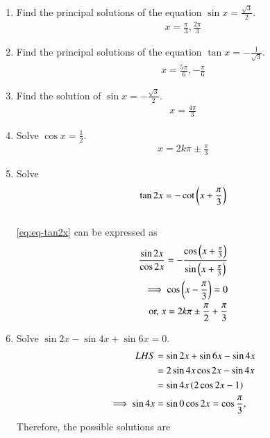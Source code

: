 \begin{enumerate}[label=\thesubsection.\arabic*,ref=\thesubsection.\theenumi]
\item Find the principal solutions of the equation $\sin x = \frac{\sqrt 3}{2}$.
%
	\\
		\solution 
\begin{align}
	x = \frac{\pi}{3}, \frac{2\pi}{3}
\end{align}
%
\item Find the principal solutions of the equation $\tan x = -\frac{1}{\sqrt 3}$.
%
	\\
\solution
\begin{align}
	x = \frac{5\pi}{6}, -\frac{\pi}{6}
\end{align}
%
\item Find the solution of $\sin x = -\frac{\sqrt 3}{2}$.
%
	\\
\solution
\begin{align}
	x = \frac{4\pi}{3}
\end{align}
%
\item Solve $\cos x = \frac{1}{2}$.
%
	\\
\solution
%
\begin{align}
	x = 2k\pi \pm \frac{\pi}{3}
\end{align}
\item Solve 
\begin{align}
\tan2x=-\cot\left(x+\frac{\pi}{3}\right)
	\label{eq:eq-tan2x}
\end{align}
%
	\\
		\solution
	\eqref{eq:eq-tan2x}
	can be expressed as
\begin{align}
\frac{\sin2x}{\cos2x}=-\frac{\cos\left(x+\frac{\pi}{3}\right)}{\sin\left(x+\frac{\pi}{3}\right)}
\\
	\implies \cos\left(x-\frac{\pi}{3}\right) = 0
	\\
	\text{or, } x = 2k \pi \pm \frac{\pi}{2} + \frac{\pi}{3}
\end{align}
\item Solve $\sin2x-\sin4x+\sin6x=0$.
%
	\\
		\solution
\begin{align}
	LHS &= 
\sin2x+\sin6x-\sin4x
\\
	&=
2\sin4x\cos2x-\sin4x
\\
	&=\sin 4x \left(2\cos2x - 1\right)
	\\
	\implies \sin 4x &= \sin 0
	\cos 2x = \cos \frac{\pi}{3},\,
\end{align}
Therefore, the possible solutions are
\begin{align}

\end{align}
\end{enumerate}
